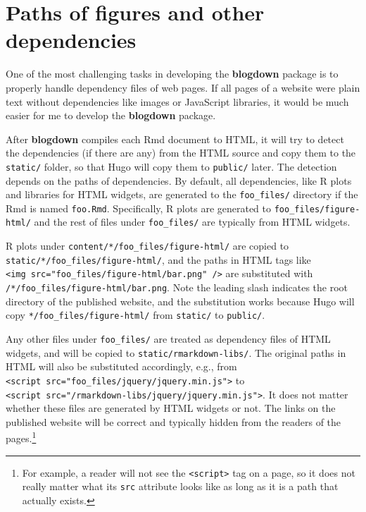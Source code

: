 \documentclass[12pt,]{krantz}
\theoremstyle{definition}
\theoremstyle{definition}
\theoremstyle{definition}
\theoremstyle{remark}
\begin{document}
\section{Paths of figures and other dependencies}\label{dep-path}

One of the most challenging tasks in developing the \textbf{blogdown}
package is to properly handle dependency files
of web pages. If all pages of a website were plain text without
dependencies like images or JavaScript libraries, it would be much
easier for me to develop the \textbf{blogdown} package.

After \textbf{blogdown} compiles each Rmd document to HTML, it will try
to detect the dependencies (if there are any) from the HTML source and
copy them to the \texttt{static/} folder, so that Hugo will copy them to
\texttt{public/} later. The detection depends on the paths of
dependencies. By default, all dependencies, like R plots and libraries
for HTML widgets, are generated to the \texttt{foo\_files/} directory if
the Rmd is named \texttt{foo.Rmd}. Specifically, R plots are generated
to \texttt{foo\_files/figure-html/} and the rest of files under
\texttt{foo\_files/} are typically from HTML widgets.

R plots under \texttt{content/*/foo\_files/figure-html/} are copied to
\texttt{static/*/foo\_files/figure-html/}, and the paths in HTML tags
like
\texttt{\textless{}img\ src="foo\_files/figure-html/bar.png"\ /\textgreater{}}
are substituted with \texttt{/*/foo\_files/figure-html/bar.png}. Note
the leading slash indicates the root directory of the published website,
and the substitution works because Hugo will copy
\texttt{*/foo\_files/figure-html/} from \texttt{static/} to
\texttt{public/}.

Any other files under \texttt{foo\_files/} are treated as dependency
files of HTML widgets, and will be copied to
\texttt{static/rmarkdown-libs/}. The original paths in HTML will also be
substituted accordingly, e.g., from
\texttt{\textless{}script\ src="foo\_files/jquery/jquery.min.js"\textgreater{}}
to
\texttt{\textless{}script\ src="/rmarkdown-libs/jquery/jquery.min.js"\textgreater{}}.
It does not matter whether these files are generated by HTML widgets or
not. The links on the published website will be correct and typically
hidden from the readers of the pages.\footnote{For example, a reader
  will not see the \texttt{\textless{}script\textgreater{}} tag on a
  page, so it does not really matter what its \texttt{src} attribute
  looks like as long as it is a path that actually exists.}
\end{document}
